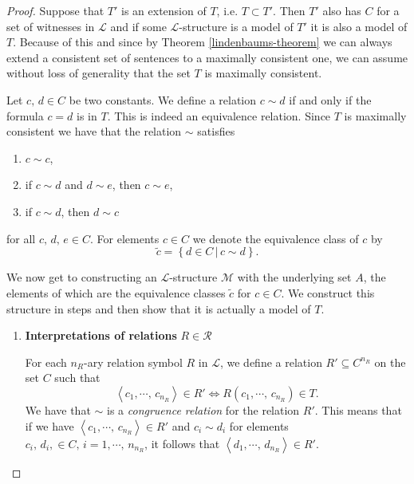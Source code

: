\documentclass[../../main.tex]{subfiles}
\begin{document}
\begin{proof}
    Suppose that $T'$ is an extension of $T$, i.e. $T \subset T'$.
    Then $T'$ also has $C$ for a set of witnesses in $\mathcal{L}$ and if some $\mathcal{L}$-structure is a model of $T'$ it is also a model of $T$.
    Because of this and since by Theorem \ref{lindenbaums-theorem} we can always extend a consistent set of sentences to a maximally consistent one,
    we can assume without loss of generality that the set $T$ is maximally consistent.

    Let $c,\, d \in C$ be two constants. 
    We define a relation $c \sim d$ if and only if the formula $c = d$ is in $T$.
    This is indeed an equivalence relation.
    Since $T$ is maximally consistent we have that the relation $\sim$ satisfies
    \begin{enumerate}[label=(\roman*)]
        \item $c \sim c$,
        \item if $c \sim d$ and $d \sim e$, then $c \sim e$,
        \item if $c \sim d$, then $d \sim c$
    \end{enumerate}
    for all $c,\, d,\, e \in C$.
    For elements $c \in C$ we denote the equivalence class of $c$ by
    $$\tilde{c} = \left\{d \in C \,\vert\,c \sim d\right\}.$$

    We now get to constructing an $\mathcal{L}$-structure $\mathcal{M}$ with the underlying set $A$,
    the elements of which are the equivalence classes $\tilde{c}$ for $c \in C$.
    We construct this structure in steps and then show that it is actually a model of $T$.
    \begin{enumerate}
        \item \label{lemma-proof-step-1} \textbf{Interpretations of relations} $R \in \mathcal{R}$
        
        For each $n_R$-ary relation symbol $R$ in $\mathcal{L}$,
        we define a relation $R' \subseteq C^{n_R}$ on the set $C$ such that
        \begin{equation}\label{congruence-eq}
            \left<c_1,\cdots,\,c_{n_R}\right> \in R' \iff R(c_1,\cdots,\,c_{n_R}) \in T.
        \end{equation}
        We have that $\sim$ is a \emph{congruence relation} for the relation $R'$.
        This means that if we have $\left<c_1,\cdots,\,c_{n_R}\right> \in R'$ and $c_i \sim d_i$ for elements $c_i,\, d_i, \in C,\, i = 1,\cdots,\, n_{n_R}$, 
        it follows that $\left<d_1,\cdots,\,d_{n_R}\right> \in R'$.
        

\end{enumerate}
\end{proof}
\end{document}
